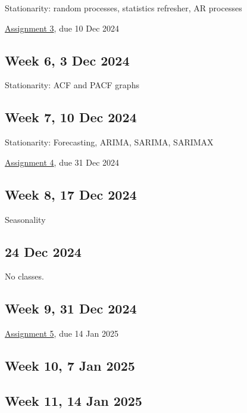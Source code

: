 \documentclass[
  letterpaper,
  DIV=11,
  numbers=noendperiod]{scrreprt}
\begin{document}
Stationarity: random processes, statistics refresher, AR processes

\href{assignments/assignment3}{Assignment 3}, due 10 Dec 2024

\subsection*{Week 6, 3 Dec 2024}\label{week-6-3-dec-2024}

Stationarity: ACF and PACF graphs

\subsection*{Week 7, 10 Dec 2024}\label{week-7-10-dec-2024}

Stationarity: Forecasting, ARIMA, SARIMA, SARIMAX

\href{assignments/assignment4}{Assignment 4}, due 31 Dec 2024

\subsection*{Week 8, 17 Dec 2024}\label{week-8-17-dec-2024}

Seasonality

\subsection*{24 Dec 2024}\label{dec-2024}

{No classes.}

\subsection*{Week 9, 31 Dec 2024}\label{week-9-31-dec-2024}

\href{assignments/assignment5}{Assignment 5}, due 14 Jan 2025

\subsection*{Week 10, 7 Jan 2025}\label{week-10-7-jan-2025}

\subsection*{Week 11, 14 Jan 2025}\label{week-11-14-jan-2025}
\end{document}
